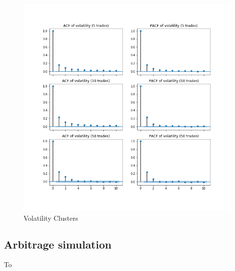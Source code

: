 \begin{figure}
    \includegraphics[width=\linewidth]{plots/basic_volaclusters_intraday.png}
    \caption{Volatility Clusters}
    \label{fig:basic_volaclusters}
\end{figure}

\subsection{Arbitrage simulation}

To 
